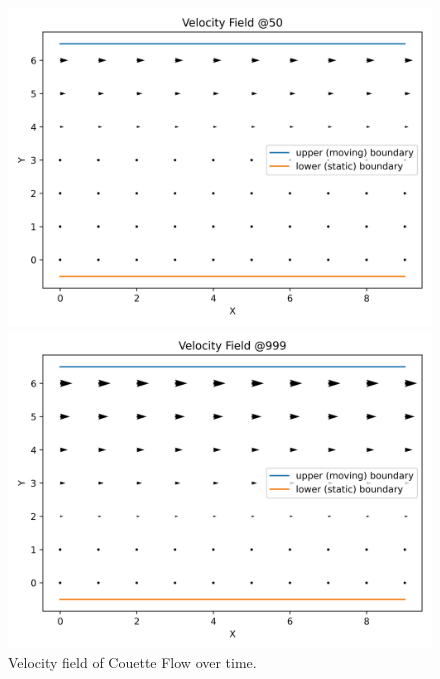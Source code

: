 \begin{center}
    \begin{figure}[H]
        \begin{minipage}{0.5\textwidth}
            \includegraphics[width=\linewidth]{graphs/CouetteFlow/velocity_field_couette_flow_50}
        \end{minipage}%
        \begin{minipage}{0.5\textwidth}
            \includegraphics[width=\linewidth]{graphs/CouetteFlow/velocity_field_couette_flow_999}
        \end{minipage}
        \caption{Velocity field of Couette Flow over time.}
        \label{fig:cf-velocity-field-over-time}
    \end{figure}
\end{center}


